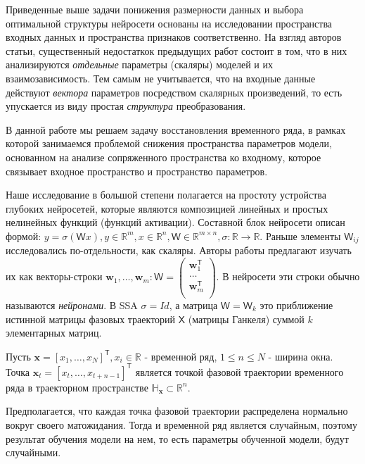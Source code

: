 \documentclass{article}
\begin{document}
Приведенные выше задачи понижения размерности данных и выбора оптимальной структуры нейросети основаны на исследовании пространства входных данных и пространства признаков соответственно. На взгляд авторов статьи, существенный недостаткок предыдущих работ состоит в том, что в них анализируются \textit{отдельные} параметры (скаляры) моделей и их взаимозависимость. Тем самым не учитывается, что на входные данные действуют \textit{вектора} параметров посредством скалярных произведений, то есть упускается из виду простая \textit{структура} преобразования.

В данной работе мы решаем задачу восстановления временного ряда, в рамках которой занимаемся проблемой снижения пространства параметров модели, основанном на анализе сопряженного пространства ко входному, которое связывает входное пространство и пространство параметров. 

Наше исследование в большой степени полагается на простоту устройства глубоких нейросетей, которые являются композицией линейных и простых нелинейных функций (функций активации). Составной блок нейросети описан формой:  $y=\sigma(\mathsf{W}x), y \in \mathbb{R}^m, x \in \mathbb{R}^n, \mathsf{W} \in \mathbb{R}^{m \times n}, \sigma: \mathbb{R} \to \mathbb{R}$. Раньше элементы $\mathsf{W}_{ij}$ исследовались по-отдельности, как скаляры. Авторы работы предлагают изучать их как векторы-строки $\mathbf{w}_1, \dots, \mathbf{w}_m: \mathsf{W} = \begin{pmatrix}
\mathbf{w}_1^{\mathsf{T}}\\
\dots\\
\mathbf{w}_m^{\mathsf{T}}\\
\end{pmatrix}$. В нейросети эти строки обычно называются \textit{нейронами}. В SSA $\sigma = Id$, а матрица $\mathsf{W}=\mathsf{W}_k$ это приближение истинной матрицы фазовых траекторий $\mathsf{X}$ (матрицы Ганкеля) суммой $k$ элементарных матриц.


Пусть $\mathbf{x} = [x_1, \dots, x_N]^{\mathsf{T}}, x_i \in \mathbb{R}$ - временной ряд, $1 \le n \le N$ - ширина окна. Точка $\mathbf{x}_t = [x_t, \dots, x_{t + n - 1}]^{\mathsf{T}}$ является точкой фазовой траектории временного ряда в траекторном пространстве $\mathbb{H}_{\mathbf{x}} \subset \mathbb{R}^n$. 

Предполагается, что каждая точка фазовой траектории распределена нормально вокруг своего матожидания. Тогда и временной ряд является случайным, поэтому результат обучения модели на нем, то есть параметры обученной модели, будут случайными.
\end{document}
